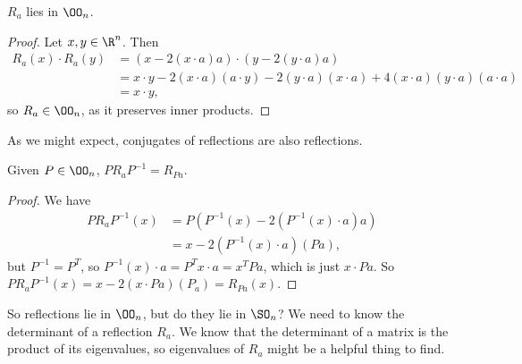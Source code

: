 \documentclass[a4]{scrreprt}
\begin{document}
\begin{definition}
\begin{center}

	\end{center}
\end{definition}

\begin{lemma}
	$R_a$ lies in $\OO_n$.
\end{lemma}
\begin{proof}
	Let $x, y \in \R^n$. Then
	\begin{align*}
		R_a(x) \cdot R_a(y) &= (x - 2(x \cdot a)a) \cdot (y - 2(y \cdot a)a) \\
		&= x \cdot y - 2(x \cdot a)(a \cdot y) - 2(y \cdot a)(x \cdot a) + 4(x \cdot a)(y \cdot a)(a \cdot a)\\
		&= x \cdot y,
	\end{align*}
	so $R_a \in \OO_n$, as it preserves inner products.
\end{proof}

As we might expect, conjugates of reflections are also reflections.

\begin{lemma}
	Given $P \in \OO_n$, $P R_a P^{-1} = R_{Pa}$.
\end{lemma}
\begin{proof}
	We have
	\begin{align*}
		P R_a P^{-1}(x) &= P(P^{-1}(x) - 2(P^{-1}(x) \cdot a)a) \\
		&= x - 2(P^{-1}(x) \cdot a)(P a),
	\end{align*}
	but $P^{-1} = P^T$, so $P^{-1}(x)\cdot a = P^T x \cdot a = x^T P a$, which is just $x \cdot Pa$. So $P R_a P^{-1}(x) = x - 2(x\cdot Pa)(P_a) = R_{Pa}(x)$.
\end{proof}


So reflections lie in $\OO_n$, but do they lie in $\SO_n$? We need to know the determinant of a reflection $R_a$. We know that the determinant of a matrix is the product of its eigenvalues, so eigenvalues of $R_a$ might be a helpful thing to find. 
\end{document}
